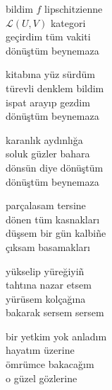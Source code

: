 \documentclass[10pt, openright, oneside]{memoir}
\theoremstyle{definition}
\begin{document}
\vspace*{\fill}
%
\newpage
{}
\vspace*{\fill}
\begin{cverse}
  bildim $f$ lipschitzienne \\
  $\mathcal{L}(U, V)$ kategori \\
  geçirdim tüm vakiti \\
  dönüştüm beynemaza

  kitabına yüz sürdüm \\
  türevli denklem bildim \\
  ispat arayıp gezdim \\
  dönüştüm beynemaza

  karanlık aydınlığa \\
  soluk güzler bahara \\
  dönsün diye dönüştüm \\
  dönüştüm beynemaza
\end{cverse}
\vspace*{\fill}
%
\newpage
{}
\vspace*{\fill}
\settowidth{\versewidth}{düşsem bir gün kalbi\~ne}
\begin{cverse}
  parçalasam tersine \\
  dönen tüm kasnakları \\
  düşsem bir gün kalbi\~ne \\
  çıksam basamakları

  yükselip yüreğiyi\~n \\
  tahtına nazar etsem \\
  yürüsem kolçağına \\
  bakarak sersem sersem
\end{cverse}
\vspace*{\fill}
%
\newpage
{}
\vspace*{\fill}
\settowidth{\versewidth}{bir yetkim yok anladım}
\begin{cverse}
  bir yetkim yok anladım \\
  hayatım üzerine \\
  ömrümce bakacağım \\
  o güzel gözlerine
\end{cverse}
\vspace*{\fill}
%
\newpage
{}
\vspace*{\fill}
\end{document}
